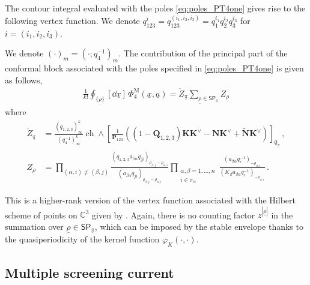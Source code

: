 The contour integral evaluated with the poles \eqref{eq:poles_PT4one} gives rise to the following vertex function.
We denote $q_{123}^{i} = q_{123}^{(i_1,i_2,i_3)} = q_1^{i_1} q_2^{i_2} q_3^{i_3}$ for $i = (i_1,i_2,i_3)$.
\begin{theorem}\label{thm:vertex_MacMahon}
    We denote $(\cdot)_m = (\cdot;q_4^{-1})_m$.
    The contribution of the principal part of the conformal block associated with the poles specified in \eqref{eq:poles_PT4one} is given as follows,
    \begin{align}
    \frac{1}{k!} \oint_{\{\underline{\rho}\}} [\dd{\underline{x}}] \, \Phi_{4}^\text{M}(\underline{x},\underline{a}) 
    = \mathring{Z}_{\underline{\pi}} \sum_{\underline{\rho} \in \mathsf{SP}_{\underline{\pi}}} Z_{\underline{\rho}}
    \end{align}
    where
\begin{subequations}
\begin{align}
    \mathring{Z}_{\underline{\pi}} & = \frac{(q_{1,2,3})_\infty^k}{(q_4^{-1})_\infty^k} \operatorname{ch} \wedge \left[ \frac{1}{\mathbf{P}_{123}} \left( (1 - \mathbf{Q}_{1,2,3} ) \mathbf{K} \mathbf{K}^\vee - \mathbf{N} \mathbf{K}^\vee + \widetilde{\mathbf{N}} \mathbf{K}^\vee \right) \right]_{\emptyset_{\underline{\pi}}}
    \, , \\
    Z_{\underline{\rho}} & = \prod_{(\alpha,i) \neq (\beta,j)}
    \frac{(q_{1,2,3} a_{\beta\alpha}q_{ji})_{\rho_{\beta,j}-\rho_{\alpha,i}}}{(a_{\beta\alpha}q_{ji})_{\rho_{\beta,j}-\rho_{\alpha,i}}} \prod_{\substack{\alpha,\beta=1,\ldots,n \\ i \in \pi_\alpha}} \frac{(a_{\beta\alpha} q_i^{-1})_{-\rho_{\alpha,i}}}{(K_\beta a_{\beta\alpha} q_i^{-1})_{-\rho_{\alpha,i}}}
    \, .
\end{align}    
\end{subequations}
\end{theorem}
This is a higher-rank version of the vertex function associated with the Hilbert scheme of points on $\mathbb{C}^3$ given by  \cite{Cao:2023lon,Piazzalunga:2023qik}.
Again, there is no counting factor $z^{|\underline{\rho}|}$ in the summation over $\underline{\rho} \in \mathsf{SP}_{\underline{\pi}}$, which can be imposed by the stable envelope thanks to the quasiperiodicity of the kernel function $\varphi_K(\cdot,\cdot)$.


\subsection{Multiple screening current}

